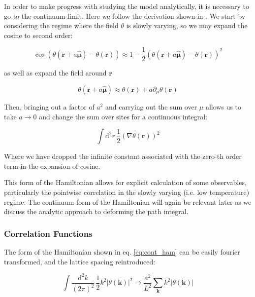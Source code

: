 \documentclass[12pt]{article}
\begin{document}
In order to make progress with studying the model analytically, it is necessary to go to the continuum limit. Here we follow the derivation shown in
\cite{drouintouchette2022kosterlitzthoulessphasetransitionintroduction}.
We start by considering the regime where the field $\theta$ is slowly varying, so we may expand the cosine to second order:

\begin{equation}
	\cos(\theta(\mathbf{r}+a\hat{\pmb{\mu}})-\theta(\mathbf{\mathbf{r}})) \approx 1 - \frac{1}{2}\left( \theta(\mathbf{r}+a\hat{\pmb{\mu}})-\theta(\mathbf{\mathbf{r}}) \right)^2
\end{equation}

as well as expand the field around $\mathbf{r}$

\begin{equation}
	\theta(\mathbf{r}+a\hat{\pmb{\mu}}) \approx \theta(\mathbf{r}) + a\partial_{\mu}\theta(\mathbf{r})
\end{equation}

Then, bringing out a factor of $a^2$ and carrying out the sum over $\mu$ allows us to take $a \rightarrow 0$ and change the sum over sites for a continuous integral:

\begin{equation}\label{eq:cont_ham}
	\int\mathrm{d}^2 r \, \frac{1}{2}\left( \nabla\theta(\mathbf{r}) \right)^2
\end{equation}

Where we have dropped the infinite constant associated with the zero-th order term in the expansion of cosine.

This form of the Hamiltonian allows for explicit calculation of some observables, particularly the pointwise correlation in the slowly varying (i.e. low temperature) regime.
The continuum form of the Hamiltonian will again be relevant later as we discuss the analytic approach to deforming the path integral.

\subsubsection{Correlation Functions}

The form of the Hamiltonian shown in eq. \ref{eq:cont_ham} can be easily fourier transformed, and the lattice spacing reintroduced:

\begin{equation}
	\int \frac{\mathrm{d}^2 k}{(2\pi)^2} \, \frac{1}{2} k^2 \left|\theta(\mathbf{k})\right|^2 \rightarrow \frac{a^2}{L^2} \sum_{\mathbf{k}} k^2 \left| \theta(\mathbf{k}) \right|
\end{equation}
\end{document}
